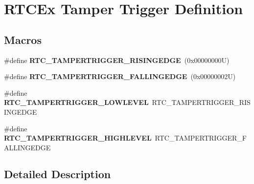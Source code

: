 \hypertarget{group___r_t_c_ex___tamper___trigger___definitions}{}\section{R\+T\+C\+Ex Tamper Trigger Definition}
\label{group___r_t_c_ex___tamper___trigger___definitions}
\subsection*{Macros}
\begin{DoxyCompactItemize}
\item 
\mbox{\label{group___r_t_c_ex___tamper___trigger___definitions_ga7956947a7b9350248051fc077a525474}} 
\#define {\bfseries R\+T\+C\+\_\+\+T\+A\+M\+P\+E\+R\+T\+R\+I\+G\+G\+E\+R\+\_\+\+R\+I\+S\+I\+N\+G\+E\+D\+GE}~(0x00000000\+U)
\item 
\mbox{\label{group___r_t_c_ex___tamper___trigger___definitions_gafdc500829e8f36346f1cbca1a52eb083}} 
\#define {\bfseries R\+T\+C\+\_\+\+T\+A\+M\+P\+E\+R\+T\+R\+I\+G\+G\+E\+R\+\_\+\+F\+A\+L\+L\+I\+N\+G\+E\+D\+GE}~(0x00000002\+U)
\item 
\mbox{\label{group___r_t_c_ex___tamper___trigger___definitions_ga20c580db49e266f2295aeed5a6915b4e}} 
\#define {\bfseries R\+T\+C\+\_\+\+T\+A\+M\+P\+E\+R\+T\+R\+I\+G\+G\+E\+R\+\_\+\+L\+O\+W\+L\+E\+V\+EL}~R\+T\+C\+\_\+\+T\+A\+M\+P\+E\+R\+T\+R\+I\+G\+G\+E\+R\+\_\+\+R\+I\+S\+I\+N\+G\+E\+D\+GE
\item 
\mbox{\label{group___r_t_c_ex___tamper___trigger___definitions_gae3a6644686f404fa94d23ccab6f5165b}} 
\#define {\bfseries R\+T\+C\+\_\+\+T\+A\+M\+P\+E\+R\+T\+R\+I\+G\+G\+E\+R\+\_\+\+H\+I\+G\+H\+L\+E\+V\+EL}~R\+T\+C\+\_\+\+T\+A\+M\+P\+E\+R\+T\+R\+I\+G\+G\+E\+R\+\_\+\+F\+A\+L\+L\+I\+N\+G\+E\+D\+GE
\end{DoxyCompactItemize}


\subsection{Detailed Description}
